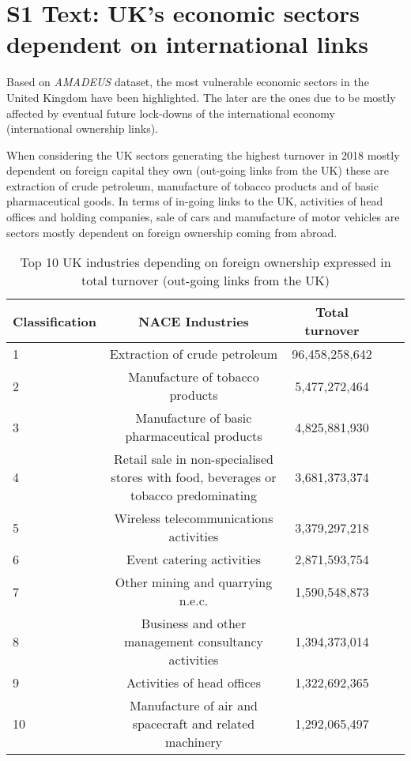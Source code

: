 %
%

\section*{S1 Text: UK's economic sectors dependent on international links}



Based on \emph {AMADEUS} dataset, the most vulnerable economic sectors in the United Kingdom have been highlighted. The later are the ones due to be mostly affected by eventual future lock-downs of the international economy (international ownership links). 

When considering the UK sectors generating the highest turnover in 2018 mostly dependent on foreign capital they own (out-going links from the UK) these are extraction of crude petroleum, manufacture of tobacco products and of basic pharmaceutical goods. In terms of in-going links to the UK, activities of head offices and holding companies, sale of cars and manufacture of motor vehicles are sectors mostly dependent on foreign ownership coming from abroad.

\FloatBarrier

\begin{table}[!ht]
\begin{adjustwidth}{-2.25in}{0in}
\caption{Top 10 UK industries depending on foreign ownership expressed in total turnover (out-going links from the UK)\label{tab:uk_outgoing}}
\centering
\medskip
\begin{tabular}{|l|c|c|c|c|}
\hline
Classification  & NACE Industries & Total turnover \\ 
\hline
1 &     Extraction of crude petroleum &   96,458,258,642  \\
\hline
2 & Manufacture of tobacco products &  5,477,272,464  \\
\hline
3 & Manufacture of basic pharmaceutical products &  4,825,881,930 \\
\hline
4 &  Retail sale in non-specialised stores with food, beverages or tobacco predominating  &   3,681,373,374  \\
\hline
5 &  Wireless telecommunications activities &   3,379,297,218  \\
\hline
6 & Event catering activities & 2,871,593,754  \\
\hline
7 &  Other mining and quarrying n.e.c. &  1,590,548,873  \\
\hline
8 & Business and other management consultancy activities &  1,394,373,014 \\
\hline
9 &  Activities of head offices &  1,322,692,365 \\
\hline
10 & Manufacture of air and spacecraft and related machinery &  1,292,065,497 \\
\hline
\end{tabular}
\end{adjustwidth}
\end{table}

